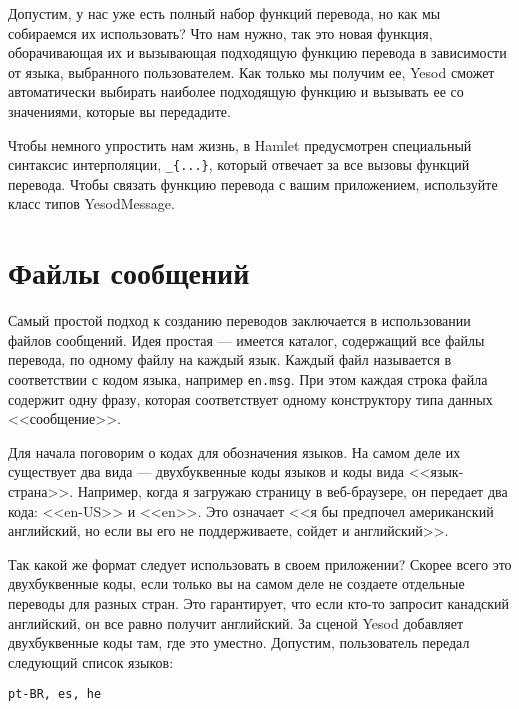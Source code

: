 Допустим, у нас уже есть полный набор функций перевода, но как мы собираемся их использовать? Что нам нужно, так это новая функция, оборачивающая их и вызывающая подходящую функцию перевода в зависимости от языка, выбранного пользователем. Как только мы получим ее, Yesod сможет автоматически выбирать наиболее подходящую функцию и вызывать ее со значениями, которые вы передадите.

Чтобы немного упростить нам жизнь, в Hamlet предусмотрен специальный синтаксис интерполяции, \lstinline'_{...}', который отвечает за все вызовы функций перевода. Чтобы связать функцию перевода с вашим приложением, используйте класс типов YesodMessage.

\section{Файлы сообщений} %

Самый простой подход к созданию переводов заключается в использовании файлов сообщений. Идея простая --- имеется каталог, содержащий все файлы перевода, по одному файлу на каждый язык. Каждый файл называется в соответствии с кодом языка, например \lstinline'en.msg'. При этом каждая строка файла содержит одну фразу, которая соответствует одному конструктору типа данных <<сообщение>>.


Для начала поговорим о кодах для обозначения языков. На самом деле их существует два вида --- двухбуквенные коды языков и коды вида <<язык-страна>>. Например, когда я загружаю страницу в веб-браузере, он передает два кода: <<en-US>> и <<en>>. Это означает <<я бы предпочел американский английский, но если вы его не поддерживаете, сойдет и английский>>.

Так какой же формат следует использовать в своем приложении? Скорее всего это двухбуквенные коды, если только вы на самом деле не создаете отдельные переводы для разных стран. Это гарантирует, что если кто-то запросит канадский английский, он все равно получит английский. За сценой Yesod добавляет двухбуквенные коды там, где это уместно. Допустим, пользователь передал следующий список языков:

\begin{lstlisting}
pt-BR, es, he
\end{lstlisting}

